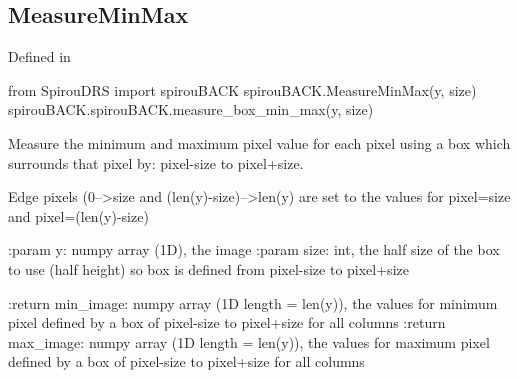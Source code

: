 \begin{minipage}{\textwidth}
\subsection{MeasureMinMax}

Defined in \spirouBACK{}

\begin{pythonbox}
from SpirouDRS import spirouBACK
spirouBACK.MeasureMinMax(y, size)
spirouBACK.spirouBACK.measure_box_min_max(y, size)
\end{pythonbox}

\begin{pythondocstring}
Measure the minimum and maximum pixel value for each pixel using a box which
surrounds that pixel by:  pixel-size to pixel+size.

Edge pixels (0-->size and (len(y)-size)-->len(y) are
set to the values for pixel=size and pixel=(len(y)-size)

:param y: numpy array (1D), the image
:param size: int, the half size of the box to use (half height)
             so box is defined from  pixel-size to pixel+size

:return min_image: numpy array (1D length = len(y)), the values
                   for minimum pixel defined by a box of pixel-size to
                   pixel+size for all columns
:return max_image: numpy array (1D length = len(y)), the values
                   for maximum pixel defined by a box of pixel-size to
                   pixel+size for all columns
\end{pythondocstring}
\end{minipage}

